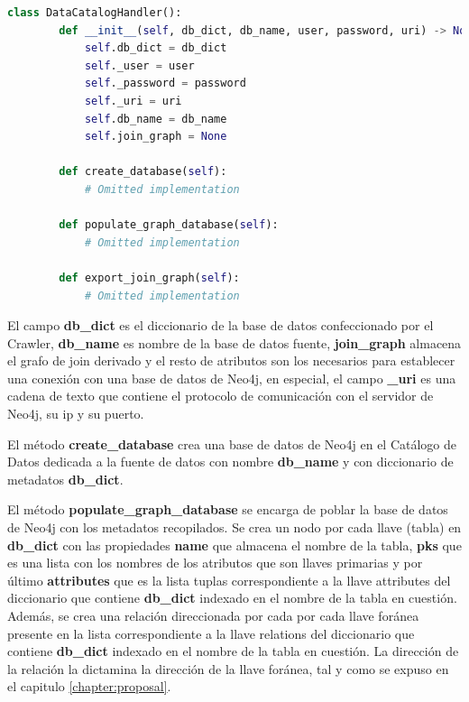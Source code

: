 \begin{lstlisting}[label={code:catalog}, caption={Clase DataCatalogHandler}, language={python}]
    class DataCatalogHandler():
        def __init__(self, db_dict, db_name, user, password, uri) -> None:
            self.db_dict = db_dict
            self._user = user
            self._password = password
            self._uri = uri
            self.db_name = db_name
            self.join_graph = None

        def create_database(self):
            # Omitted implementation

        def populate_graph_database(self):
            # Omitted implementation

        def export_join_graph(self):
            # Omitted implementation

\end{lstlisting}

El campo \textbf{db\_dict} es el diccionario de la base de datos confeccionado por el Crawler, \textbf{db\_name} es 
nombre de la base de datos fuente, \textbf{join\_graph} almacena el grafo de join derivado y el resto de atributos 
son los necesarios para establecer una conexión con una base de datos de Neo4j, en especial, el campo \textbf{\_uri} 
es una cadena de texto que contiene el protocolo de comunicación con el servidor de Neo4j, su ip y su puerto. 

El método \textbf{create\_database} crea una base de datos de Neo4j en el Catálogo de Datos dedicada a la 
fuente de datos con nombre \textbf{db\_name} y con diccionario de metadatos \textbf{db\_dict}. 

El método \textbf{populate\_graph\_database} se encarga de poblar la base de datos de Neo4j con los metadatos
recopilados. Se crea 
un nodo por cada llave (tabla) 
en \textbf{db\_dict} con las propiedades \textbf{name} que almacena el nombre de la tabla, \textbf{pks} que es una 
lista con los nombres de los atributos que son llaves primarias y por \'ultimo \textbf{attributes} que 
es la lista tuplas correspondiente a la llave attributes del diccionario que contiene \textbf{db\_dict} 
indexado en el nombre de la tabla en cuestión. Además, se crea una relación direccionada por cada por cada llave for\'anea 
presente en la lista correspondiente a la llave relations del diccionario que contiene \textbf{db\_dict} 
indexado en el nombre de la tabla en cuestión. La dirección de la relación la dictamina la dirección de la llave 
for\'anea, tal y como se expuso en el capitulo \ref{chapter:proposal}.

